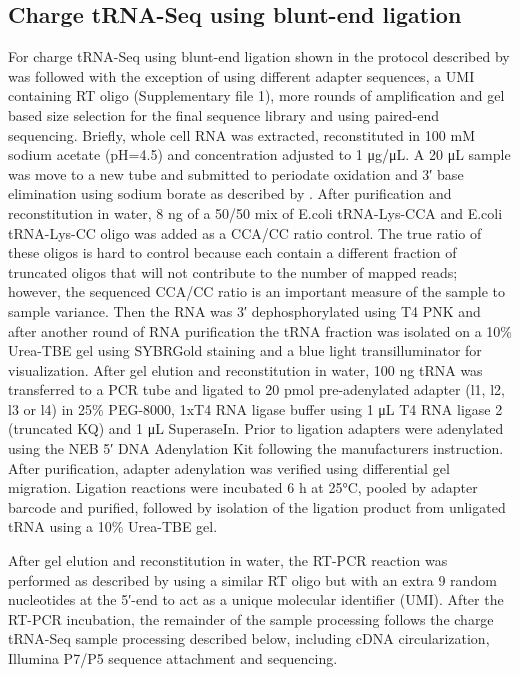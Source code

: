 \documentclass[9pt,lineno]{elife}
\begin{document}
\subsection{Charge tRNA-Seq using blunt-end ligation}
For charge tRNA-Seq using blunt-end ligation shown in  the protocol described by \cite{Behrens2021-gb} was followed with the exception of using different adapter sequences, a UMI containing RT oligo (Supplementary file 1), more rounds of amplification and gel based size selection for the final sequence library and using paired-end sequencing.
Briefly, whole cell RNA was extracted, reconstituted in 100 mM sodium acetate (pH=4.5) and concentration adjusted to 1 μg/μL.
A 20 μL sample was move to a new tube and submitted to periodate oxidation and 3′ base elimination using sodium borate as described by \cite{Evans2017-st}.
After purification and reconstitution in water, 8 ng of a 50/50 mix of E.coli tRNA-Lys-CCA and E.coli tRNA-Lys-CC oligo was added as a CCA/CC ratio control.
The true ratio of these oligos is hard to control because each contain a different fraction of truncated oligos that will not contribute to the number of mapped reads; however, the sequenced CCA/CC ratio is an important measure of the sample to sample variance.
Then the RNA was 3′ dephosphorylated using T4 PNK and after another round of RNA purification the tRNA fraction was isolated on a 10\% Urea-TBE gel using SYBRGold staining and a blue light transilluminator for visualization.
After gel elution and reconstitution in water, 100 ng tRNA was transferred to a PCR tube and ligated to 20 pmol pre-adenylated adapter (l1, l2, l3 or l4) in 25\% PEG-8000, 1xT4 RNA ligase buffer using 1 μL T4 RNA ligase 2 (truncated KQ) and 1 μL SuperaseIn.
Prior to ligation adapters were adenylated using the NEB 5′ DNA Adenylation Kit following the manufacturers instruction.
After purification, adapter adenylation was verified using differential gel migration.
Ligation reactions were incubated 6 h at 25°C, pooled by adapter barcode and purified, followed by isolation of the ligation product from unligated tRNA using a 10\% Urea-TBE gel.

After gel elution and reconstitution in water, the RT-PCR reaction was performed as described by \cite{Behrens2021-gb} using a similar RT oligo but with an extra 9 random nucleotides at the 5′-end to act as a unique molecular identifier (UMI).
After the RT-PCR incubation, the remainder of the sample processing follows the charge tRNA-Seq sample processing described below, including cDNA circularization, Illumina P7/P5 sequence attachment and sequencing.
\end{document}
